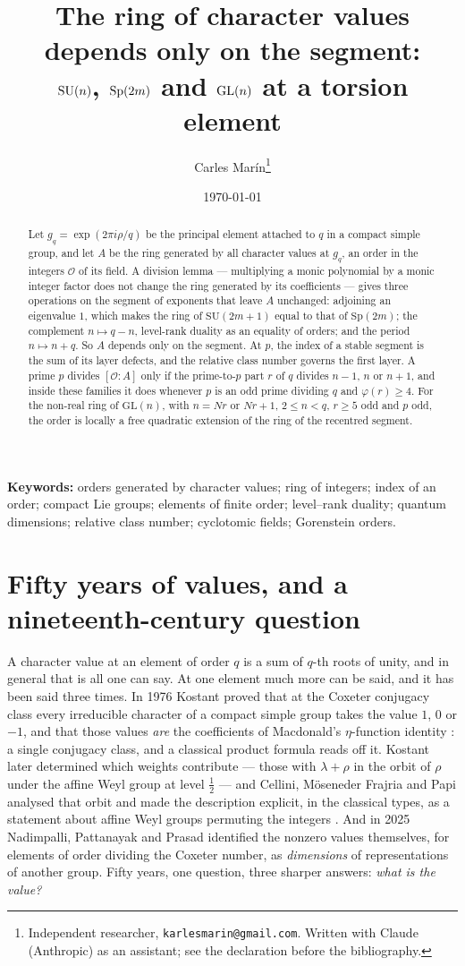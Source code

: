 \documentclass[11pt,a4paper]{article}
\title{\vspace{-1.4cm}\Large The ring of character values depends only on the segment:\\
$\SU(n)$, $\Sp(2m)$ and $\GL(n)$ at a torsion element}
\author{\normalsize Carles Mar\'in\thanks{Independent researcher, \texttt{karlesmarin@gmail.com}.
Written with Claude (Anthropic) as an assistant; see the declaration before the bibliography.}}
\date{\normalsize\today}
\theoremstyle{definition}
\newcommand{\Sp}{\mathrm{Sp}}
\newcommand{\SU}{\mathrm{SU}}
\newcommand{\GL}{\mathrm{GL}}
\newcommand{\cO}{\mathcal{O}}
\begin{document}
\maketitle

\begin{abstract}
\noindent
Let $g_q=\exp(2\pi i\rho/q)$ be the principal element attached to $q$ in a compact simple group,
and let $A$ be the ring generated by all character values at $g_q$, an order in the
integers $\cO$ of its field. A division lemma --- multiplying a monic polynomial by a monic integer
factor does not change the ring generated by its coefficients --- gives three operations on the
segment of exponents that leave $A$ unchanged: adjoining an eigenvalue $1$, which makes
the ring of $\SU(2m+1)$ equal to that of $\Sp(2m)$; the complement $n\mapsto q-n$, level-rank
duality as an equality of orders; and the period $n\mapsto n+q$. So $A$ depends only on the
segment. At $p$, the index of a stable segment is the sum of its layer defects, and the
relative class number governs the first layer. A prime $p$ divides $[\cO:A]$ only if the
prime-to-$p$ part $r$ of $q$ divides $n-1$, $n$ or $n+1$, and inside these families it does
whenever $p$ is an odd prime dividing $q$ and $\varphi(r)\ge4$. For the non-real ring of $\GL(n)$, with $n=Nr$ or $Nr+1$,
$2\le n<q$, $r\ge5$ odd and $p$ odd, the order is locally a free quadratic extension of the ring of
the recentred segment.
\end{abstract}

\noindent\textbf{Keywords:} orders generated by character values; ring of integers; index of an
order; compact Lie groups; elements of finite order; level--rank duality; quantum dimensions;
relative class number; cyclotomic fields; Gorenstein orders.

\section{Fifty years of values, and a nineteenth-century question}

A character value at an element of order $q$ is a sum of $q$-th roots of unity, and in general
that is all one can say. At one element much more can be said, and it has been said three times.
In 1976 Kostant proved that at the Coxeter conjugacy class every irreducible character of a compact
simple group takes the value $1$, $0$ or $-1$, and that those values \emph{are} the coefficients of
Macdonald's $\eta$-function identity \cite[Thm.~3.1]{Kostant76}: a single conjugacy class, and a
classical product formula reads off it. Kostant later determined which weights contribute --- those
with $\lambda+\rho$ in the orbit of $\rho$ under the affine Weyl group at level $\tfrac12$
\cite{Kostant04} --- and Cellini, M\"oseneder Frajria and Papi analysed that orbit and made the
description explicit, in the classical types, as a statement about affine Weyl groups permuting the
integers \cite{CMP}. And in 2025 Nadimpalli, Pattanayak and Prasad \cite{NPP} identified the nonzero
values themselves, for elements of order dividing the Coxeter number, as \emph{dimensions} of
representations of another group. Fifty years, one question, three sharper answers: \emph{what is
the value?}
\end{document}
